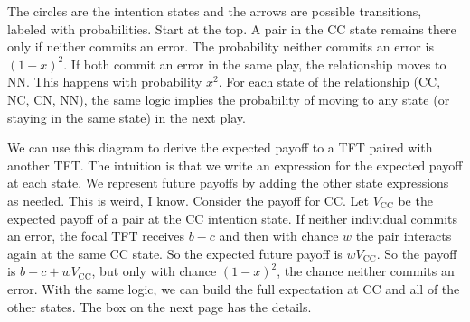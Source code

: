 \documentclass[10pt,reqno]{amsbook}
\numberwithin{equation}{chapter}
\begin{document}
The circles are the intention states and the arrows are possible transitions, labeled with probabilities. 
Start at the top. A pair in the CC state remains there only if neither commits an error. The probability neither commits an error is $(1-x)^2$. If both commit an error in the same play, the relationship moves to NN. This happens with probability $x^2$. For each state of the relationship (CC, NC, CN, NN), the same logic implies the probability of moving to any state (or staying in the same state) in the next play.

We can use this diagram to derive the expected payoff to a TFT paired with another TFT. The intuition is that we write an expression for the expected payoff at each state. We represent future payoffs by adding the other state expressions as needed. This is weird, I know. Consider the payoff for CC. Let $V_\text{CC}$ be the expected payoff of a pair at the CC intention state. If neither individual commits an error, the focal TFT receives $b-c$ and then with chance $w$ the pair interacts again at the same CC state. So the expected future payoff is $wV_\text{CC}$. So the payoff is $b-c + wV_\text{CC}$, but only with chance $(1-x)^2$, the chance neither commits an error. With the same logic, we can build the full expectation at CC and all of the other states. The box on the next page has the details. 
\end{document}
